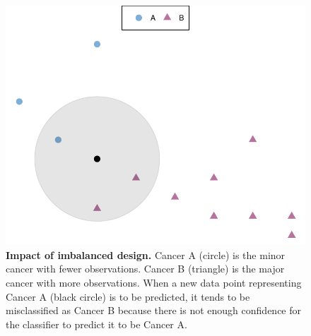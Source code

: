 \begin{figure}[ht!]
    \centering
    \includegraphics[scale=0.9]{graphics/imbalanced.pdf}
    \caption{\textbf{Impact of imbalanced design.} Cancer A (circle) is the minor cancer with fewer observations. Cancer B (triangle) is the major cancer with more observations. When a new data point representing Cancer A (black circle) is to be predicted, it tends to be misclassified as Cancer B because there is not enough confidence for the classifier to predict it to be Cancer A.}
    \label{fig:imbalanced}
\end{figure}
